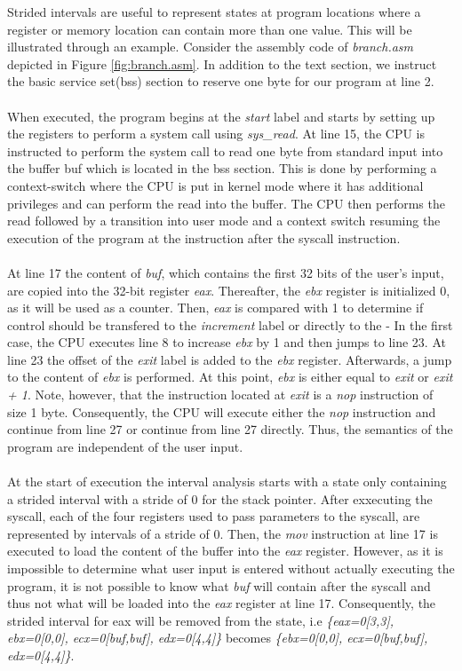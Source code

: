 \documentclass{kththesis}
\renewcommand{\it}[1]{\textit{#1}}
\begin{document}
\clearpage
\noindent
Strided intervals are useful to represent states at program locations where a register or memory location can contain more than one value. This will be illustrated through an example. Consider the assembly code of \it{branch.asm} depicted in Figure \ref{fig:branch.asm}. In addition to the text section, we instruct the basic service set(bss) section to reserve one byte for our program at line 2. 
\\ \\
When executed, the program begins at the \it{start} label and starts by setting up the registers to perform a system call using \it{sys\_read}. At line 15, the CPU is instructed to perform the system call to read one byte from standard input into the buffer buf which is located in the bss section. This is done by performing a context-switch where the CPU is put in kernel mode where it has additional privileges and can perform the read into the buffer. The CPU then performs the read followed by a transition into user mode and a context switch resuming the execution of the program at the instruction after the syscall instruction.
\\ \\ 
At line 17 the content of \it{buf}, which contains the first 32 bits of the user's input, are copied into the 32-bit register \it{eax}. Thereafter, the \it{ebx} register is initialized 0, as it will be used as a counter. Then, \it{eax} is compared with 1 to determine if control should be transfered to the \it{increment} label or directly to the \label{continue}- In the first case, the CPU executes line 8 to increase \it{ebx} by 1 and then jumps to line 23. At line 23 the offset of the \it{exit} label is added to the \it{ebx} register. Afterwards, a jump to the content of \it{ebx} is performed. At this point, \it{ebx} is either equal to \it{exit} or \it{exit + 1}. Note, however, that the instruction located at \it{exit} is a \it{nop} instruction of size 1 byte. Consequently, the CPU will execute either the \it{nop} instruction and continue from line 27 or continue from line 27 directly. Thus, the semantics of the program are independent of the user input. 
\\ \\
At the start of execution the interval analysis starts with a state only containing a strided interval with a stride of 0 for the stack pointer. After exxecuting the syscall, each of the four registers used to pass parameters to the syscall, are represented by intervals of a stride of 0. Then, the \it{mov} instruction at line 17 is executed to load the content of the buffer into the \it{eax} register. However, as it is impossible to determine what user input is entered without actually executing the program, it is not possible to know what \it{buf} will contain after the syscall and thus not what will be loaded into the \it{eax} register at line 17. Consequently, the strided interval for eax will be removed from the state, i.e \it{\{eax=0[3,3], ebx=0[0,0], ecx=0[buf,buf], edx=0[4,4]\}} becomes \it{\{ebx=0[0,0], ecx=0[buf,buf], edx=0[4,4]\}}.
\end{document}
